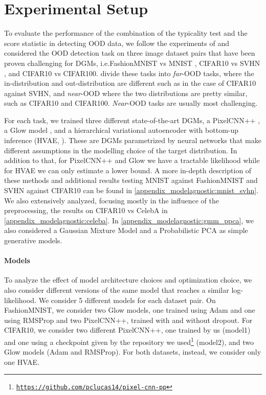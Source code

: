 {%
\section{Experimental Setup}

To evaluate the performance of the combination of the typicality test and the score statistic in detecting OOD data, we follow the experiments of \textcite{nalisnick_deep_2019, hendrycks_deep_2019} and considered the OOD detection task on three image dataset pairs that have been proven challenging for DGMs, i.e.\@ FashionMNIST \parencite{xiao_fashionmnist_2017} vs MNIST \parencite{lecun_mnist_1998}, CIFAR10 \parencite{krizhevsky_learning_2009} vs SVHN \parencite{netzer_reading_2011}, and CIFAR10 vs CIFAR100. \textcite{winkens_contrastive_2020} divide these tasks into \textit{far}-OOD tasks, where the in-distribution and out-distribution are different such as in the case of CIFAR10 against SVHN, and \textit{near}-OOD where the two distributions are pretty similar, such as CIFAR10 and CIFAR100. \textit{Near}-OOD tasks are usually most challenging.

For each task, we trained three different state-of-the-art DGMs, a PixelCNN++ \parencite{salimans_pixelcnn_2017}, a Glow model \parencite{kingma_glow_2018}, and a hierarchical variational autoencoder \parencite{kingma_autoencoding_2014,rezende_stochastic_2014} with bottom-up inference (HVAE, \citealp{burda_importance_2016}). These are DGMs parametrized by neural networks that make different assumptions in the modelling choice of the target distribution. In addition to that, for PixelCNN++ and Glow we have a tractable likelihood while for HVAE we can only estimate a lower bound. A more in-depth description of these methods and additional results testing MNIST against FashionMNIST and SVHN against CIFAR10 can be found in \cref{appendix_modelagnostic:mnist_svhn}. We also extensively analyzed, focusing mostly in the influence of the preprocessing, the results on CIFAR10 vs CelebA \parencite{liu_deep_2015} in \cref{appendix_modelagnostic:celeba}. In \cref{appendix_modelagnostic:gmm_ppca}, we also considered a Gaussian Mixture Model and a Probabilistic PCA as simple generative models.

\paragraph{Models} To analyze the effect of model architecture choices and optimization choice, we also consider different versions of the same model that reaches a similar log-likelihood. We consider 5 different models for each dataset pair. On FashionMNIST, we consider two Glow models, one trained using Adam and one using RMSProp and two PixelCNN++, trained with and without dropout. For CIFAR10, we consider two different PixelCNN++, one trained by us (model1) and one using a checkpoint given by the repository we used\footnote{ \href{https://github.com/pclucas14/pixel-cnn-pp}{\texttt{https://github.com/pclucas14/pixel-cnn-pp}}} (model2), and two Glow models (Adam and RMSProp). For both datasets, instead, we consider only one HVAE. 


}
